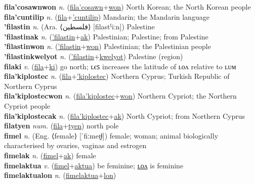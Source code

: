 \textbf{fila'cosawnwon} \textit{n.} (\hyperref[fila'cosawn]{fila'cosawn}+\hyperref[won]{won})
North Korean; the North Korean people \label{fila'cosawnwon} \\
\textbf{fila'cuntilip} \textit{n.} (\hyperref[fila]{fila}+\hyperref['cuntilip]{'cuntilip})
Mandarin; the Mandarin language \label{fila'cuntilip} \\
\textbf{'filastin} \textit{n.} (Ara. ⟨فلسطين⟩ [filastˁiːn])
Palestine \label{'filastin} \\
\textbf{'filastinak} \textit{n.} (\hyperref['filastin]{'filastin}+\hyperref[ak]{ak})
Palestinian; Palestine; from Palestine \label{'filastinak} \\
\textbf{'filastinwon} \textit{n.} (\hyperref['filastin]{'filastin}+\hyperref[won]{won})
Palestinian; the Palestinian people \label{'filastinwon} \\
\textbf{'filastinkwelyot} \textit{n.} (\hyperref['filastin]{'filastin}+\hyperref[kwelyot]{kwelyot})
Palestine (region) \label{'filastinkwelyot} \\
\textbf{filaki} \textit{v.} (\hyperref[fila]{fila}+\hyperref[ki]{ki})
go north; ʟєꜱ increases the latitude of ʟᴏᴧ relative to ʟᴜᴍ \label{filaki} \\
\textbf{fila'kiplostec} \textit{n.} (\hyperref[fila]{fila}+\hyperref['kiplostec]{'kiplostec})
Northern Cyprus; Turkish Republic of Northern Cyprus \label{fila'kiplostec} \\
\textbf{fila'kiplostecwon} \textit{n.} (\hyperref[fila'kiplostec]{fila'kiplostec}+\hyperref[won]{won})
Northern Cypriot; the Northern Cypriot people \label{fila'kiplostecwon} \\
\textbf{fila'kiplostecak} \textit{n.} (\hyperref[fila'kiplostec]{fila'kiplostec}+\hyperref[ak]{ak})
North Cypriot; from Northern Cyprus \label{fila'kiplostecak} \\
\textbf{filatyen} \textit{num.} (\hyperref[fila]{fila}+\hyperref[tyen]{tyen})
north pole \label{filatyen} \\
\textbf{fimel} \textit{n.} (Eng. ⟨female⟩ [ˈfiːmeɪ̯ɫ])
female; woman; animal biologically characterised by ovaries, vaginas and estrogen \label{fimel} \\
\textbf{fimelak} \textit{n.} (\hyperref[fimel]{fimel}+\hyperref[ak]{ak})
female \label{fimelak} \\
\textbf{fimelaktua} \textit{v.} (\hyperref[fimel]{fimel}+\hyperref[aktua]{aktua})
be feminine; \hyperref[fimelaktualon]{ʟᴏᴧ} is feminine \label{fimelaktua} \\
\textbf{fimelaktualon} \textit{n.} (\hyperref[fimelaktua]{fimelaktua}+\hyperref[lon]{lon})
